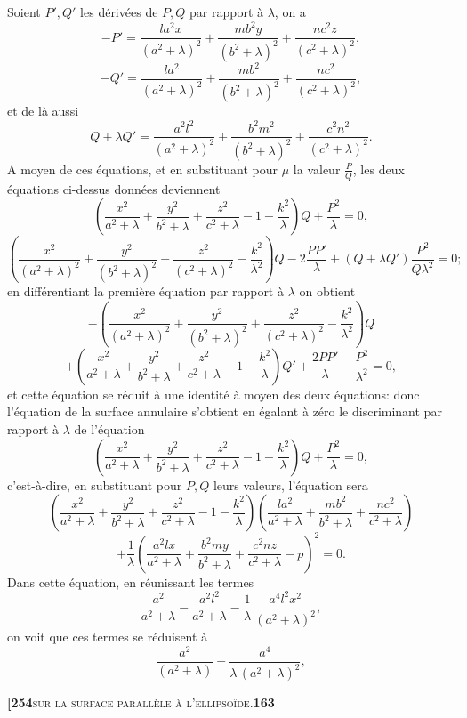 \documentclass[11pt]{article}
\begin{document}
\noindent Soient $P', Q'$ les dérivées de $P, Q$ par rapport à $\lambda$, on a
\[
-P' = \frac{la^2x}{(a^2 + \lambda)^2} + \frac{mb^2y}{(b^2 + \lambda)^2} + \frac{nc^2z}{(c^2 + \lambda)^2},
\]
\[
-Q' = \frac{la^2}{(a^2 + \lambda)^2} + \frac{mb^2}{(b^2 + \lambda)^2} + \frac{nc^2}{(c^2 + \lambda)^2},
\]
et de là aussi
\[
Q + \lambda Q' = \frac{a^2l^2}{(a^2 + \lambda)^2} + \frac{b^2m^2}{(b^2 + \lambda)^2} + \frac{c^2n^2}{(c^2 + \lambda)^2}.
\]
A moyen de ces équations, et en substituant pour $\mu$ la valeur $\tfrac{P}{Q}$, les deux équations ci-dessus données deviennent
\[
\left(\frac{x^2}{a^2 + \lambda} + \frac{y^2}{b^2 + \lambda} + \frac{z^2}{c^2 + \lambda} - 1 - \frac{k^2}{\lambda}\right)Q + \frac{P^2}{\lambda} = 0,
\]
\[
\left(\frac{x^2}{(a^2 + \lambda)^2} + \frac{y^2}{(b^2 + \lambda)^2} + \frac{z^2}{(c^2 + \lambda)^2} - \frac{k^2}{\lambda^2}\right)Q - 2\frac{PP'}{\lambda} + (Q + \lambda Q')\frac{P^2}{Q\lambda^2} = 0;
\]
en différentiant la première équation par rapport à $\lambda$ on obtient
\[
-\left(\frac{x^2}{(a^2 + \lambda)^2} + \frac{y^2}{(b^2 + \lambda)^2} + \frac{z^2}{(c^2 + \lambda)^2} - \frac{k^2}{\lambda^2}\right)Q
\]
\[
+ \left(\frac{x^2}{a^2 + \lambda} + \frac{y^2}{b^2 + \lambda} + \frac{z^2}{c^2 + \lambda} - 1 - \frac{k^2}{\lambda}\right)Q' + \frac{2PP'}{\lambda} - \frac{P^2}{\lambda^2} = 0,
\]
et cette équation se réduit à une identité à moyen des deux équations: donc l'équation de la surface annulaire s'obtient en égalant à zéro le discriminant par rapport à $\lambda$ de l'équation
\[
\left(\frac{x^2}{a^2 + \lambda} + \frac{y^2}{b^2 + \lambda} + \frac{z^2}{c^2 + \lambda} - 1 - \frac{k^2}{\lambda}\right)Q + \frac{P^2}{\lambda} = 0,
\]
c'est-à-dire, en substituant pour $P, Q$ leurs valeurs, l'équation sera
\[
\left(\frac{x^2}{a^2 + \lambda} + \frac{y^2}{b^2 + \lambda} + \frac{z^2}{c^2 + \lambda} - 1 - \frac{k^2}{\lambda}\right)\left(\frac{la^2}{a^2 + \lambda} + \frac{mb^2}{b^2 + \lambda} + \frac{nc^2}{c^2 + \lambda}\right)
\]
\[
+ \frac{1}{\lambda}\left(\frac{a^2lx}{a^2 + \lambda} + \frac{b^2my}{b^2 + \lambda} + \frac{c^2nz}{c^2 + \lambda} - p\right)^2 = 0.
\]
Dans cette équation, en réunissant les termes
\[
\frac{a^2}{a^2 + \lambda} - \frac{a^2l^2}{a^2 + \lambda} - \frac{1}{\lambda}\,\frac{a^4l^2x^2}{(a^2 + \lambda)^2},
\]
on voit que ces termes se réduisent à
\[
\frac{a^2}{(a^2 + \lambda)} - \frac{a^4}{\lambda\,(a^2 + \lambda)^2},
\]

\newpage

\noindent\textbf{[254}\hfill\textsc{sur la surface parallèle à l'ellipsoïde.}\hfill\textbf{163}
\end{document}
